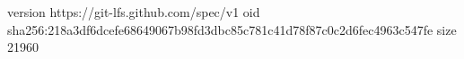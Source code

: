 version https://git-lfs.github.com/spec/v1
oid sha256:218a3df6dcefe68649067b98fd3dbc85c781c41d78f87c0c2d6fec4963c547fe
size 21960
